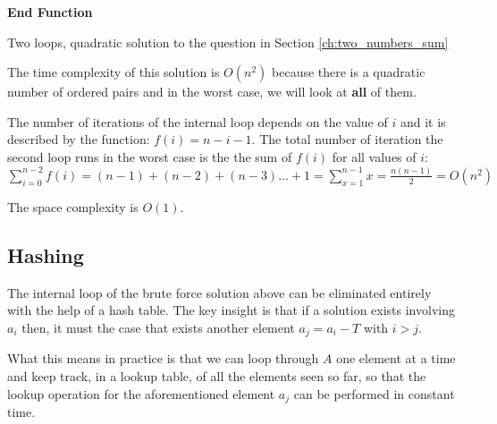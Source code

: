 \begin{algorithm}
	\SetAlgoLined {}
	
	 

	\textbf{End Function}
	
		\caption{Two loops, quadratic solution to the question in Section \ref{ch:two_numbers_sum} }
		\label{algo:two_number_sum_bruteforce}
\end{algorithm}




The time complexity of this solution is $O(n^2)$ because there is a quadratic number of
ordered pairs and in the worst case, we will look at \textbf{all} of them.

The number of iterations of the internal loop depends on the value of $i$ and
it is described by the function: $f(i) = n-i-1$. The total number of iteration the second
loop runs in the worst case is the the sum of $f(i)$ for all values of $i$: 
$\sum_{i=0}^{n-2} f(i) = (n-1) + (n-2) + (n-3) \ldots + 1 =\sum_{x=1}^{n-1} x= \frac{n(n-1)}{2} = O(n^2)$

The space complexity is $O(1)$.



\subsection{Hashing}
\label{sec:two_numbers:hashing}
The internal loop of the brute force solution above can be eliminated entirely with the help of a hash table.
The key insight is that if a solution exists involving $a_i$ then, it must the case that exists another element $a_j  = a_i-T$ with $i > j$. 

What this means in practice is that we can loop through $A$ one element at a time and keep track, in a lookup table, of all the elements seen so far, so that the lookup operation for the aforementioned element $a_j$ can be performed in constant time.


